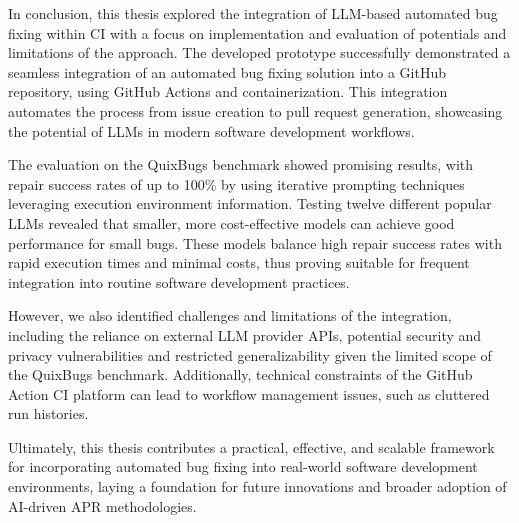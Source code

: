 In conclusion, this thesis explored the integration of LLM-based automated bug fixing within \acf{CI} with a focus on implementation and evaluation of potentials and limitations of the approach. The developed prototype successfully demonstrated a seamless integration of an automated bug fixing solution into a GitHub repository, using GitHub Actions and containerization. This integration automates the process from issue creation to pull request generation, showcasing the potential of LLMs in modern software development workflows.

The evaluation on the QuixBugs benchmark showed promising results, with repair success rates of up to 100\% by using iterative prompting techniques leveraging execution environment information. Testing twelve different popular \acp{LLM} revealed that smaller, more cost-effective models can achieve good performance for small bugs. These models balance high repair success rates with rapid execution times and minimal costs, thus proving suitable for frequent integration into routine software development practices.

However, we also identified challenges and limitations of the integration, including the reliance on external LLM provider APIs, potential security and privacy vulnerabilities and restricted generalizability given the limited scope of the QuixBugs benchmark. Additionally, technical constraints of the GitHub Action CI platform can lead to workflow management issues, such as cluttered run histories.

Ultimately, this thesis contributes a practical, effective, and scalable framework for incorporating automated bug fixing into real-world software development environments, laying a foundation for future innovations and broader adoption of AI-driven \ac{APR} methodologies.